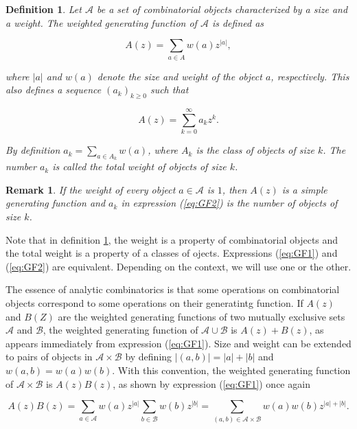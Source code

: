 \documentclass{article}
\newtheorem{definition}{Definition}
\newtheorem{remark}{Remark}
\begin{document}
\begin{definition}
\label{def:GF}
Let $\mathcal{A}$ be a set of combinatorial objects characterized by a
size and a weight. The weighted generating function of $\mathcal{A}$ is
defined as

\begin{equation}
\label{eq:GF1}
A(z) = \sum_{a \in A} w(a) z^{|a|},
\end{equation}

\noindent
where $|a|$ and $w(a)$ denote the size and weight of the object $a$,
respectively. This also defines a sequence $(a_k)_{k \geq 0}$ such that 

\begin{equation}
\label{eq:GF2}
A(z) = \sum_{k=0}^\infty a_k z^k.
\end{equation}

By definition $a_k = \sum_{a \in A_k}w(a)$, where $A_k$ is the class of
objects of size $k$. The number $a_k$ is called the total weight of
objects of size $k$.
\end{definition}

\begin{remark}
\label{rem:noweight}
If the weight of every object $a \in \mathcal{A}$ is $1$, then $A(z)$ is a
simple generating function and $a_k$ in expression (\ref{eq:GF2}) is
the number of objects of size $k$.
\end{remark}

Note that in definition \ref{def:GF}, the weight is a property of
combinatorial objects and the total weight is a property of a classes of
ojects. Expressions (\ref{eq:GF1}) and (\ref{eq:GF2}) are equivalent.
Depending on the context, we will use one or the other.

The essence of analytic combinatorics is that some operations on
combinatorial objects correspond to some operations on their generatintg
function. If $A(z)$ and $B(Z)$ are the weighted generating functions of
two mutually exclusive sets $\mathcal{A}$ and $\mathcal{B}$, the weighted
generating function of $\mathcal{A} \cup \mathcal{B}$ is $A(z) + B(z)$, as
appears immediately from expression (\ref{eq:GF1}). Size and weight can be
extended to pairs of objects in $\mathcal{A} \times \mathcal{B}$ by
defining $|(a,b)| = |a| + |b|$ and $w(a,b) = w(a)w(b)$. With this
convention, the weighted generating function of $\mathcal{A} \times
\mathcal{B}$ is $A(z)B(z)$, as shown by expression (\ref{eq:GF1})
once again

\begin{equation*}
A(z)B(z) =
\sum_{a\in \mathcal{A}}w(a)z^{|a|} \sum_{b\in \mathcal{B}}w(b)z^{|b|}
= \sum_{(a,b) \in \mathcal{A} \times \mathcal{B}} w(a)w(b)z^{|a|+|b|}.
\end{equation*}
\end{document}
